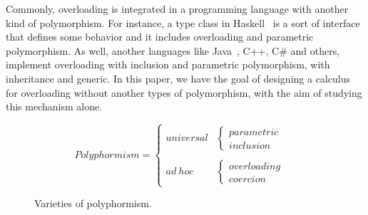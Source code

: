 \documentclass{article}
\begin{document}
\begin{comment}
We may imagine that a preprocessing of the program will eliminate overloading by giving different names to the different functions; in this sense overloading is just a convenient syntactic abbreviation.
 Overloading is not true polymorphism: instead of a value having many types, we allow a symbol to have many types, but the values denoted by that symbol have distinct and possibly incompatible types. Similarly, coercions do not achieve true polymorphism: an operator may appear to accept values of many types, but the values must be converted to some representation before the operator can use them; hence that operator really works on (has) only one type. Moreover, the output type is no longer dependent on the input type, as is the case in parametric polymorphism.
\end{comment}

Commonly, overloading is integrated in a programming language with another kind of polymorphism. For instance, a type class in Haskell~\cite{wadlerBlott:popl89, Ribeiro2013, Nipkow:1993:TCT:158511.158698, Odersky:1995:SLO:224164.224195} is a sort of interface that defines some behavior and it includes overloading and parametric polymorphism. As well, another languages like Java~\cite{BETTINI2009261}, C++, C\# and others, implement overloading with inclusion and parametric polymorphism, with inheritance and generic. In this paper, we have the goal of designing a calculus for overloading without another types of polymorphism, with the aim of studying this mechanism alone.

\begin{figure}
\begin{center}
\[ Polyphormism = 
\begin{cases} 
     universal & 
     \begin{cases} 
     	parametric &\\
     	inclusion &
   	\end{cases} \\
		 & \\
     ad \ hoc & 
     \begin{cases} 
     	overloading & \\
     	coercion &
   	\end{cases}
 \end{cases}
\]
\caption{Varieties of polyphormism.}
\label{figure:varpolyphormism}
\end{center}
\end{figure}
\end{document}
